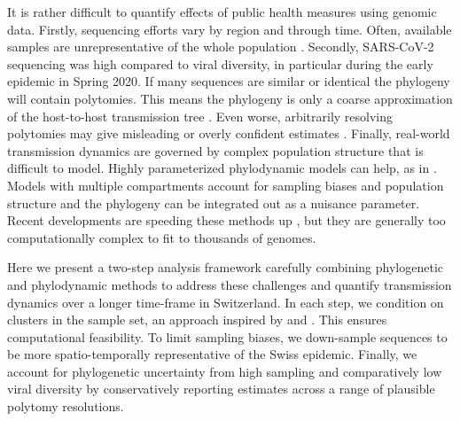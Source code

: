 \documentclass[9pt,twoside,lineno]{pnas-new} %
\begin{document}
It is rather difficult to quantify effects of public health measures using genomic data. Firstly, sequencing efforts vary by region and through time. Often, available samples are unrepresentative of the whole population \cite{Villabona-Arenas2020, DeMaio2015}. Secondly, SARS-CoV-2 sequencing was high compared to viral diversity, in particular during the early epidemic in Spring 2020. If many sequences are similar or identical the phylogeny will contain polytomies. This means the phylogeny is only a coarse approximation of the  host-to-host transmission tree \cite{Villabona-Arenas2020}. Even worse, arbitrarily resolving polytomies may give misleading or overly confident estimates \cite{Morel2021}. Finally, real-world transmission dynamics are governed by complex population structure that is difficult to model. Highly parameterized phylodynamic models can help, as in \cite{Miller2020, Geoghegan2020a, Muller2020a}. Models with multiple compartments account for sampling biases and population structure and the phylogeny can be integrated out as a nuisance parameter. Recent developments are speeding these methods up \cite{Lemey2021}, but they are generally too computationally complex to fit to thousands of genomes.

Here we present a two-step analysis framework carefully combining phylogenetic and phylodynamic methods to address these challenges and quantify transmission dynamics over a longer time-frame in Switzerland. In each step, we condition on clusters in the sample set, an approach inspired by  \cite{Muller2020} and \cite{DuPlessis}. This ensures computational feasibility. To limit sampling biases, we down-sample sequences to be more spatio-temporally representative of the Swiss epidemic. Finally, we account for phylogenetic uncertainty from high sampling and comparatively low viral diversity by conservatively reporting estimates across a range of plausible polytomy resolutions.
\end{document}
